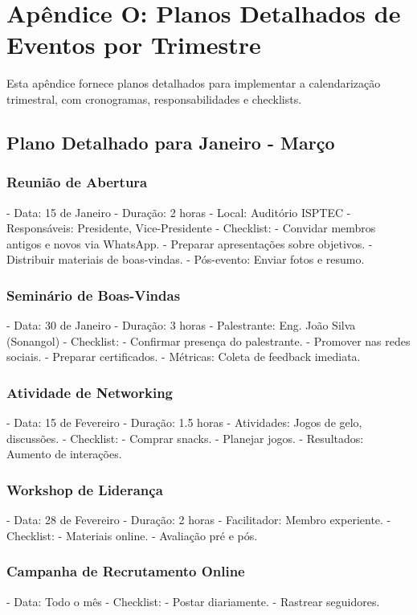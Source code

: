 \documentclass[12pt]{article}
\begin{document}
\section{Apêndice O: Planos Detalhados de Eventos por Trimestre}

Esta apêndice fornece planos detalhados para implementar a calendarização trimestral, com cronogramas, responsabilidades e checklists.

\subsection{Plano Detalhado para Janeiro - Março}

\subsubsection{Reunião de Abertura}
- Data: 15 de Janeiro
- Duração: 2 horas
- Local: Auditório ISPTEC
- Responsáveis: Presidente, Vice-Presidente
- Checklist:
  - Convidar membros antigos e novos via WhatsApp.
  - Preparar apresentações sobre objetivos.
  - Distribuir materiais de boas-vindas.
- Pós-evento: Enviar fotos e resumo.

\subsubsection{Seminário de Boas-Vindas}
- Data: 30 de Janeiro
- Duração: 3 horas
- Palestrante: Eng. João Silva (Sonangol)
- Checklist:
  - Confirmar presença do palestrante.
  - Promover nas redes sociais.
  - Preparar certificados.
- Métricas: Coleta de feedback imediata.

\subsubsection{Atividade de Networking}
- Data: 15 de Fevereiro
- Duração: 1.5 horas
- Atividades: Jogos de gelo, discussões.
- Checklist:
  - Comprar snacks.
  - Planejar jogos.
- Resultados: Aumento de interações.

\subsubsection{Workshop de Liderança}
- Data: 28 de Fevereiro
- Duração: 2 horas
- Facilitador: Membro experiente.
- Checklist:
  - Materiais online.
  - Avaliação pré e pós.

\subsubsection{Campanha de Recrutamento Online}
- Data: Todo o mês
- Checklist:
  - Postar diariamente.
  - Rastrear seguidores.
\end{document}
